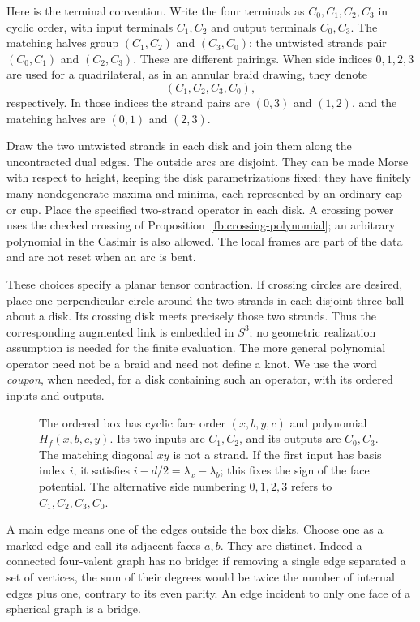 Here is the terminal convention. Write the four terminals as
\(C_0,C_1,C_2,C_3\) in cyclic order, with input terminals
\(C_1,C_2\) and output terminals \(C_0,C_3\). The matching halves
group \((C_1,C_2)\) and \((C_3,C_0)\); the untwisted
strands pair \((C_0,C_1)\) and \((C_2,C_3)\). These are different
pairings. When side indices \(0,1,2,3\) are used for a quadrilateral,
as in an annular braid drawing, they denote
\[
                 (C_1,C_2,C_3,C_0),
\]
respectively. In those indices the strand pairs are \((0,3)\)
and \((1,2)\), and the matching halves are \((0,1)\) and \((2,3)\).

Draw the two untwisted strands in each disk and join them along the
uncontracted dual edges. The outside arcs are disjoint. They can be
made Morse with respect to height, keeping the disk parametrizations
fixed: they have finitely many nondegenerate maxima and minima, each
represented by an ordinary cap or cup.
Place the specified two-strand operator in each disk. A crossing
power uses the checked crossing of Proposition~\ref{fb:crossing-polynomial};
an arbitrary polynomial in the Casimir is also allowed. The local
frames are part of the data and are not reset when an arc is bent.

These choices specify a planar tensor contraction. If crossing
circles are desired, place one perpendicular circle around the two
strands in each disjoint three-ball about a disk. Its crossing disk
meets precisely those two strands. Thus the corresponding augmented
link is embedded in \(S^3\); no geometric realization assumption is
needed for the finite evaluation. The more general polynomial operator need not be a braid and need
not define a knot. We use the word \emph{coupon}, when needed, for
a disk containing such an operator, with its ordered inputs and outputs.

\begin{figure}[ht]
 \centering
 
 \caption{The ordered box has cyclic face order \((x,b,y,c)\) and
 polynomial \(H_f(x,b,c,y)\). Its two inputs are \(C_1,C_2\), and
 its outputs are \(C_0,C_3\). The matching diagonal \(xy\) is not a
 strand. If the first input has basis index $i$, it satisfies
 \(i-d/2=\lambda_x-\lambda_b\); this fixes the sign of the face
 potential. The alternative side numbering \(0,1,2,3\) refers to
 \(C_1,C_2,C_3,C_0\).}
 \label{de:figure}
\end{figure}

A main edge means one of the edges outside the box disks. Choose one
as a marked edge and call its adjacent faces \(a,b\). They are
distinct. Indeed a connected four-valent graph has no bridge:
if removing a single edge separated a set of vertices, the sum of
their degrees would be twice the number of internal edges plus one,
contrary to its even parity. An edge incident to only one face of
a spherical graph is a bridge.

